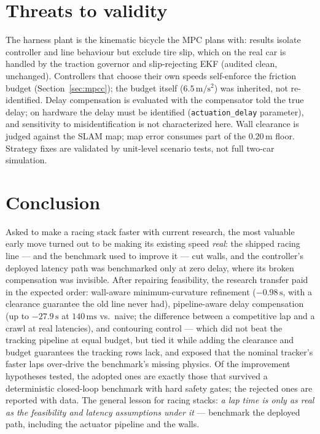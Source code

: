 \documentclass[11pt]{article}
\newcommand{\m}[1]{$#1\,\mathrm{m}$}
\newcommand{\ms}[1]{$#1\,\mathrm{ms}$}
\begin{document}
\section{Threats to validity}

The harness plant is the kinematic bicycle the MPC plans with: results
isolate controller and line behaviour but exclude tire slip, which on
the real car is handled by the traction governor and slip-rejecting EKF
(audited clean, unchanged).  Controllers that choose their own speeds
self-enforce the friction budget (Section~\ref{sec:mpcc}); the budget
itself ($6.5\,\mathrm{m/s^2}$) was inherited, not re-identified.  Delay
compensation is evaluated with the compensator told the true delay; on
hardware the delay must be identified
(\texttt{actuation\_delay} parameter), and sensitivity to
misidentification is not characterized here.  Wall clearance is judged
against the SLAM map; map error consumes part of the \m{0.20} floor.
Strategy fixes are validated by unit-level scenario tests, not full
two-car simulation.

\section{Conclusion}

Asked to make a racing stack faster with current research, the most
valuable early move turned out to be making its existing speed
\emph{real}: the shipped racing line --- and the benchmark used to
improve it --- cut walls, and the controller's deployed latency path was
benchmarked only at zero delay, where its broken compensation was
invisible.  After repairing feasibility, the research transfer paid in
the expected order: wall-aware minimum-curvature refinement
\cite{heilmeier} ($-0.98\,\mathrm{s}$, with a clearance guarantee the
old line never had), pipeline-aware delay compensation (up to
$-27.9\,\mathrm{s}$ at \ms{140} vs.\ naive; the difference between a
competitive lap and a crawl at real latencies), and contouring control
--- which did not beat the tracking pipeline at equal budget, but tied
it while adding the clearance and budget guarantees the tracking rows
lack, and exposed that the nominal tracker's faster laps over-drive the
benchmark's missing physics.
Of the improvement hypotheses tested, the adopted ones are exactly
those that survived a deterministic closed-loop benchmark with hard
safety gates; the rejected ones are reported with data.  The general
lesson for racing stacks: \emph{a lap time is only as real as the
feasibility and latency assumptions under it} --- benchmark the
deployed path, including the actuator pipeline and the walls.
\end{document}
